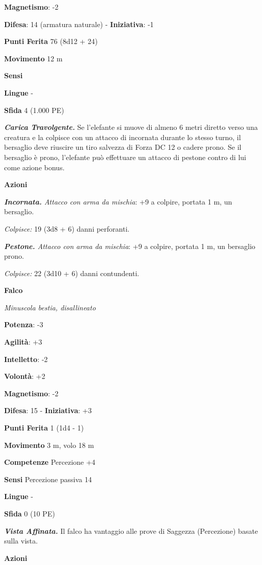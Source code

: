 \begin{multicols}{2}
\textbf{Magnetismo}: -2

\textbf{Difesa}: 14 (armatura naturale) - \textbf{Iniziativa}: -1

\textbf{Punti Ferita} 76 (8d12 + 24)

\textbf{Movimento} 12 m

\textbf{Sensi} 

\textbf{Lingue} -

\textbf{Sfida} 4 (1.000 PE)\smallskip

\emph{\textbf{Carica Travolgente.}} Se l'elefante si muove di almeno 6
metri diretto verso una creatura e la colpisce con un attacco di
incornata durante lo stesso turno, il bersaglio deve riuscire un tiro
salvezza di Forza DC 12 o cadere prono. Se il bersaglio è prono,
l'elefante può effettuare un attacco di pestone contro di lui come
azione bonus.

\smallskip\textbf{Azioni}

\emph{\textbf{Incornata.} Attacco con arma da mischia}: +9 a colpire,
portata 1 m, un bersaglio.

\emph{Colpisce:} 19 (3d8 + 6) danni perforanti.

\emph{\textbf{Pestone.} Attacco con arma da mischia}: +9 a colpire,
portata 1 m, un bersaglio prono.

\emph{Colpisce:} 22 (3d10 + 6) danni contundenti.

\textbf{Falco}

\emph{Minuscola bestia, disallineato}

\textbf{Potenza}: -3

\textbf{Agilità}: +3

\textbf{Intelletto}: -2

\textbf{Volontà}: +2

\textbf{Magnetismo}: -2

\textbf{Difesa}: 15 - \textbf{Iniziativa}: +3

\textbf{Punti Ferita} 1 (1d4 - 1)

\textbf{Movimento} 3 m, volo 18 m

\textbf{Competenze} Percezione +4

\textbf{Sensi} Percezione passiva 14

\textbf{Lingue} -

\textbf{Sfida} 0 (10 PE)\smallskip

\emph{\textbf{Vista Affinata.}} Il falco ha vantaggio alle prove di
Saggezza (Percezione) basate sulla vista.

\smallskip\textbf{Azioni}


\end{multicols}
